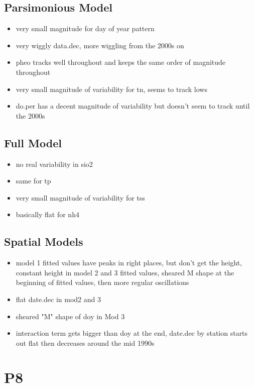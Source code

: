 \documentclass[12pt]{amsart}
\begin{document}
\subsection{Parsimonious Model}
\begin{itemize}
\item very small magnitude for day of year pattern
\item very wiggly data.dec, more wiggling from the 2000s on
\item pheo tracks well throughout and keeps the same order of magnitude throughout
\item very small magnitude of variability for tn, seems to track lows
\item do.per has a decent magnitude of variability but doesn't seem to track until the 2000s
\end{itemize}
\subsection{Full Model}
\begin{itemize}
\item no real variability in sio2
\item same for tp
\item very small magnitude of variability for tss
\item basically flat for nh4
\end{itemize}

\subsection{Spatial Models}

\begin{itemize}
\item model 1 fitted values have peaks in right places, but don't get the height, constant height in model 2 and 3 fitted values, sheared M shape at the beginning of fitted values, then more regular oscillations
\item flat date.dec in mod2 and 3
\item sheared "M" shape of doy in Mod 3
\item interaction term gets bigger than doy at the end, date.dec by station starts out flat then decreases around the mid 1990s
\end{itemize}


\section{P8}
\end{document}
